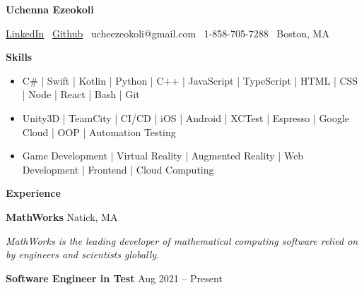 \documentclass[11pt]{article}
\begin{document}
\begin{center}
    \textbf{Uchenna Ezeokoli}\\ 
    \hrulefill
\end{center}

\begin{center}
    \href{https://www.linkedin.com/in/uchenna-ezeokoli/}{LinkedIn} 
    \textbullet \ \href{https://github.com/ucheezeokoli}{Github} \textbullet \ ucheezeokoli@gmail.com \textbullet \ 1-858-705-7288 \textbullet \ Boston, MA 
\end{center}


\begin{center}
    \textbf{Skills}
\end{center}

\begin{itemize}[noitemsep]
    \item C\# | Swift | Kotlin | Python | C++ |
    JavaScript | TypeScript | HTML | CSS | Node | React | Bash | Git
    \item Unity3D | TeamCity | CI/CD | iOS | Android | XCTest | 
    Espresso | Google Cloud | OOP | Automation Testing
    \item Game Development | Virtual Reality | Augmented Reality | Web Development | Frontend |
    Cloud Computing 
\end{itemize}

\begin{center}
    \textbf{Experience}
\end{center}

\textbf{MathWorks} \hfill Natick, MA

\textit{MathWorks is the leading developer of mathematical computing software relied on by engineers and scientists globally.}

\vspace{5pt}

\textbf{Software Engineer in Test} \hfill Aug 2021 – Present
\end{document}
